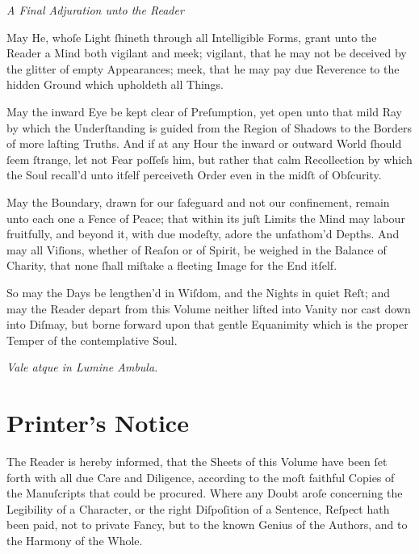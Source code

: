 \documentclass[12pt]{article}
\begin{document}
\begin{center}
\textit{A Final Adjuration unto the Reader}
\end{center}

\vspace{1em}

May He, whoſe Light ſhineth through all Intelligible Forms, grant unto the 
Reader a Mind both vigilant and meek; vigilant, that he may not be deceived 
by the glitter of empty Appearances; meek, that he may pay due Reverence to 
the hidden Ground which upholdeth all Things.

May the inward Eye be kept clear of Preſumption, yet open unto that mild 
Ray by which the Underſtanding is guided from the Region of Shadows to the 
Borders of more laſting Truths. And if at any Hour the inward or outward 
World ſhould ſeem ſtrange, let not Fear poſſeſs him, but rather that calm 
Recollection by which the Soul recall’d unto itſelf perceiveth Order even 
in the midſt of Obſcurity.

May the Boundary, drawn for our ſafeguard and not our confinement, remain 
unto each one a Fence of Peace; that within its juſt Limits the Mind may 
labour fruitfully, and beyond it, with due modeſty, adore the unfathom’d 
Depths. And may all Viſions, whether of Reaſon or of Spirit, be weighed in 
the Balance of Charity, that none ſhall miſtake a fleeting Image for the 
End itſelf.

So may the Days be lengthen’d in Wiſdom, and the Nights in quiet Reſt; and 
may the Reader depart from this Volume neither lifted into Vanity nor cast 
down into Diſmay, but borne forward upon that gentle Equanimity which is 
the proper Temper of the contemplative Soul.

\begin{flushright}
\textit{Vale atque in Lumine Ambula.}
\end{flushright}

\newpage

\section*{Printer’s Notice}

The Reader is hereby informed, that the Sheets of this Volume have been 
ſet forth with all due Care and Diligence, according to the moſt faithful 
Copies of the Manuſcripts that could be procured. Where any Doubt aroſe 
concerning the Legibility of a Character, or the right Diſpoſition of a 
Sentence, Reſpect hath been paid, not to private Fancy, but to the known 
Genius of the Authors, and to the Harmony of the Whole.
\end{document}
